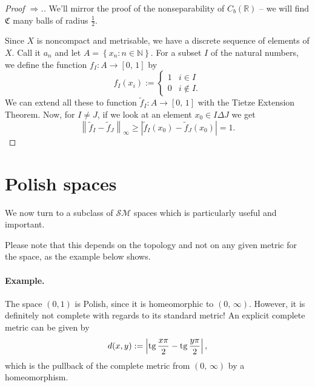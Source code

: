 \begin{proof}[Proof \(\Rightarrow\).]

We'll mirror the proof of the nonseparability of \( C_b( \mathbb{R} ) \) -- we will find \( \mathfrak{C} \) many balls of radius \( \frac{1}{2} \).

Since \( X \) is noncompact and metrisable, we have a discrete sequence of elements of \( X \). Call it \( a_n \) and let \( A = \left\{ x_n : n \in \mathbb{N} \right\} \). For a subset \( I  \) of the natural numbers, we define the function \( f_I: A \to [0,\,1] \) by
\[ 
    f_I (x_i) := \begin{cases}
        1 &i \in I \\
        0 &i \not\in I.
    \end{cases}
\]
We can extend all these to function \( \widetilde{f}_I: A \to [0,\,1] \) with the Tietze Extension Theorem. %
Now, for \( I \neq J \), if we look at an element \( x_0 \in I \Delta J\) we get
\[ 
    \left \| \widetilde{f}_I - \widetilde{f}_J \right\|_\infty \geqslant \left| \widetilde{f}_I(x_0) - \widetilde{f}_J(x_0) \right| = 1. 
\]
\end{proof}

\section{Polish spaces}
We now turn to a subclass of \( \mathcal{SM} \) spaces which is particularly useful and important.


Please note that this depends on the topology and not on any given metric for the space, as the example below shows.

\paragraph{Example.} The space \( (0,1) \) is Polish, since it is homeomorphic to \( (0,\,\infty) \). However, it is definitely not complete with regards to its standard metric! An explicit complete metric can be given by 
\[ 
    d(x, y) := \left| \operatorname{tg} \frac{x\pi}{2} - \operatorname{tg} \frac{y\pi}{2} \right|,
\]
which is the pullback of the complete metric from \( (0,\,\infty) \) by a homeomorphism.

